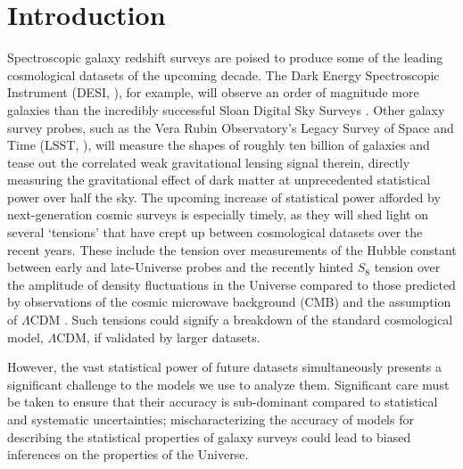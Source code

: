 \documentclass[fleqn,usenatbib]{mnras}
\begin{document}
\section{Introduction}
\label{sec:intro}
Spectroscopic galaxy redshift surveys are poised to produce some of the leading cosmological datasets of the upcoming decade. The Dark Energy Spectroscopic Instrument (DESI, \citealt{Aghamousa:2016zmz}), for example, will observe an order of magnitude more galaxies than the incredibly successful Sloan Digital Sky Surveys \citep{Dawson_2012,Dawson_2016}. Other galaxy survey probes, such as the Vera Rubin Observatory's Legacy Survey of Space and Time (LSST, \citet{Ivezic:2008fe,Mandelbaum:2018ouv}), will measure the shapes of roughly ten billion of galaxies and tease out the correlated weak gravitational lensing signal therein, directly measuring the gravitational effect of dark matter at unprecedented statistical power over half the sky. The upcoming increase of statistical power afforded by next-generation cosmic surveys is especially timely, as they will shed light on several `tensions' that have crept up between cosmological datasets over the recent years. These include the tension over measurements of the Hubble constant \citep[or, alternatively, in the sound horizon]{Di_Valentino_2021} between early and late-Universe probes and the recently hinted $S_8$ tension over the amplitude of density fluctuations in the Universe compared to those predicted by observations of the cosmic microwave background (CMB) and the assumption of $\Lambda$CDM \citep{krolewski2021cosmological, descollaboration2021dark, Heymans_2021,white2021cosmological}. Such tensions could signify a breakdown of the standard cosmological model, $\Lambda$CDM, if validated by larger datasets. 
\par 
However, the vast statistical power of future datasets simultaneously presents a significant challenge to the models we use to analyze them. Significant care must be taken to ensure that their accuracy is sub-dominant compared to statistical and systematic uncertainties; mischaracterizing the accuracy of models for describing the statistical properties of galaxy surveys could lead to biased inferences on the properties of the Universe. \par 
\end{document}
